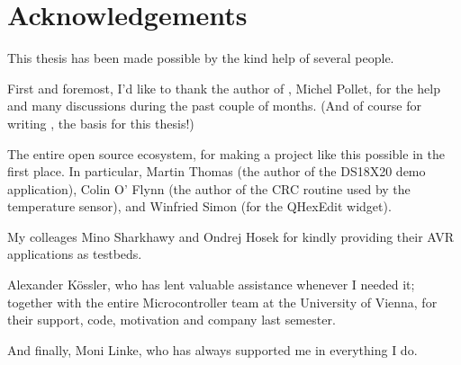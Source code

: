 \chapter{Acknowledgements} \label{chapter:acknowledgements}

This thesis has been made possible by the kind help of several people.

First and foremost, I'd like to thank the author of \simavr, Michel Pollet, for
the help and many discussions during the past couple of months. (And of course
for writing \simavr, the basis for this thesis!)

The entire open source ecosystem, for making a project like this possible in the
first place. In particular, Martin Thomas (the author of the DS18X20 demo
application), Colin O' Flynn (the author of the CRC routine used by the
temperature sensor), and Winfried Simon (for the QHexEdit widget).

My colleages Mino Sharkhawy and Ondrej Hosek for kindly providing their AVR
applications as testbeds.

Alexander K\"ossler, who has lent valuable assistance whenever I needed it;
together with the entire Microcontroller team at the University of Vienna, for
their support, code, motivation and company last semester.

And finally, Moni Linke, who has always supported me in everything I do.